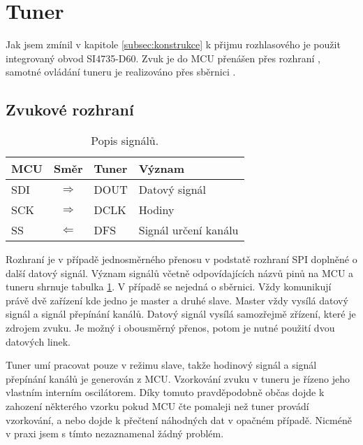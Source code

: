 \section{Tuner}
\label{sec:tuner}
Jak jsem zmínil v kapitole \ref{subsec:konstrukce} k přijmu rozhlasového je použit integrovaný obvod SI4735-D60. Zvuk je do MCU přenášen přes rozhraní \iis, samotné ovládání tuneru je realizováno přes sběrnici \iic.

\subsection{Zvukové rozhraní \iis}

\begin{table}[ht!]
\begin{center}
\begin{tabular}{|l|c|l|l|}
\hline 
MCU & Směr & Tuner & Význam \\ 
\hline 
SDI & $\Rightarrow$ & DOUT & Datový signál \\ 
\hline 
SCK & $\Rightarrow$ & DCLK & Hodiny \\ 
\hline
SS & $\Leftarrow$ & DFS & Signál určení kanálu \\ 
\hline 
\end{tabular}
\end{center}
\caption{Popis \iis signálů.}
\label{tab:iis_signals} 
\end{table}


Rozhraní \iis je v případě jednosměrného přenosu v podstatě rozhraní SPI doplněné o další datový signál. Význam signálů včetně odpovídajících názvů pinů na MCU a tuneru shrnuje tabulka \ref{tab:iis_signals}. V případě \iis se nejedná o sběrnici. Vždy komunikují právě dvě zařízení kde jedno je master a druhé slave. Master vždy vysílá datový signál a signál přepínání kanálů. Datový signál vysílá samozřejmě zřízení, které je zdrojem zvuku. Je možný i obousměrný přenos, potom je nutné použití dvou datových linek.

Tuner umí pracovat pouze v režimu slave, takže hodinový signál a signál přepínání kanálů je generován z MCU. Vzorkování zvuku v tuneru je řízeno jeho vlastním interním oscilátorem. Díky tomuto pravděpodobně občas dojde k zahození některého vzorku pokud MCU čte pomaleji než tuner provádí vzorkování, a nebo dojde k přečtení náhodných dat v opačném případě. Nicméně v praxi jsem s tímto nezaznamenal žádný problém.  



